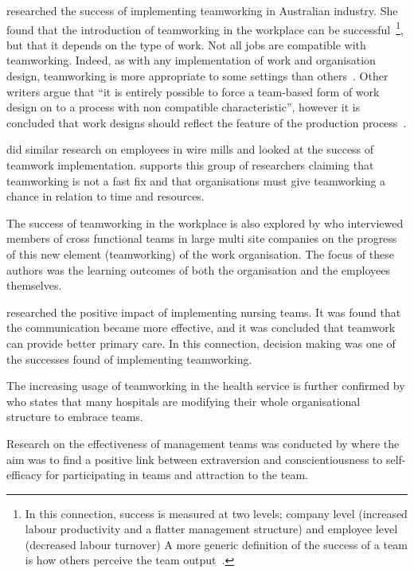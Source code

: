 \documentclass[a4paper,12pt,titlepage]{report}
\begin{document}
  \citet{lg} researched the success of implementing teamworking in Australian
  industry. She found that the introduction of teamworking in the workplace can be
  successful~\footnote{In this connection, success is measured at two levels; company level (increased labour productivity and a flatter management structure) and employee level (decreased labour turnover) A more generic definition of the success of a team is how others
  perceive the team output~\cite[399]{ahdb}.},
  but that it depends on the type of work. Not all jobs are compatible with teamworking.
  Indeed, as with any implementation of work and organisation design,
  teamworking is more appropriate to some settings than
  others~\cite[1412]{fmspdb}. Other writers argue that
  ``it is entirely possible to force a team-based form of work design on to a
  process with non compatible characteristic'', however it is concluded that
  work designs should reflect the feature of the production
  process~\cite[1538]{cspjsp}.

  \citet{cspjsp} did similar
  research on employees in wire mills and looked at the success of teamwork
  implementation. \citet{wrc} supports this group of researchers claiming
  that teamworking is not a fast fix and that organisations must give teamworking
  a chance in relation to time and resources.

  The success of teamworking in the workplace is also explored by \citet{mcsarc}
  who interviewed members of cross functional teams in large multi site companies
  on the progress of this new element (teamworking) of the work organisation.
  The focus of these authors was the learning outcomes
  of both the organisation and the employees themselves.

  \citet{kg} researched the positive impact of implementing nursing teams.
  It was found that the communication became more effective, and it was
  concluded that teamwork can provide better primary care.
  In this connection, decision making was one of the successes found of
  implementing teamworking.

  The increasing usage of teamworking in the health service is further confirmed
  by \citet{wh} who states that many hospitals are modifying their whole
  organisational structure to embrace teams.

  Research on the effectiveness of management teams was
  conducted by \citet{rjsbjb} where the aim was to find a positive link
  between extraversion and conscientiousness to self-efficacy for participating
  in teams and attraction to the team.
\end{document}
